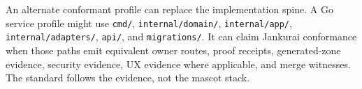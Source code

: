 An alternate conformant profile can replace the implementation spine. A Go service profile might use \texttt{cmd/}, \texttt{internal/domain/}, \texttt{internal/app/}, \texttt{internal/adapters/}, \texttt{api/}, and \texttt{migrations/}. It can claim Jankurai conformance when those paths emit equivalent owner routes, proof receipts, generated-zone evidence, security evidence, UX evidence where applicable, and merge witnesses. The standard follows the evidence, not the mascot stack.
